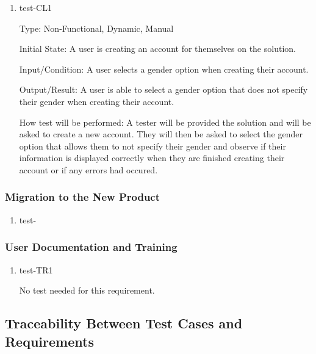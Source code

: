 \documentclass[12pt, titlepage]{article}
\begin{document}
\begin{enumerate}

  \item{test-CL1\\}

  Type: Non-Functional, Dynamic, Manual

  Initial State: A user is creating an account for themselves on the solution.

  Input/Condition: A user selects a gender option when creating their account.

  Output/Result: A user is able to select a gender option that does not specify their
  gender when creating their account.

  How test will be performed: A tester will be provided the solution and will be asked
  to create a new account. They will then be asked to select the gender option that allows
  them to not specify their gender and observe if their information is displayed correctly
  when they are finished creating their account or if any errors had occured.

\end{enumerate}

\subsubsection{Migration to the New Product}

\begin{enumerate}

  \item{test-\\}

\end{enumerate}

\subsubsection{User Documentation and Training}

\begin{enumerate}

  \item{test-TR1\\}

  No test needed for this requirement.

\end{enumerate}

\subsection{Traceability Between Test Cases and Requirements}
\end{document}
